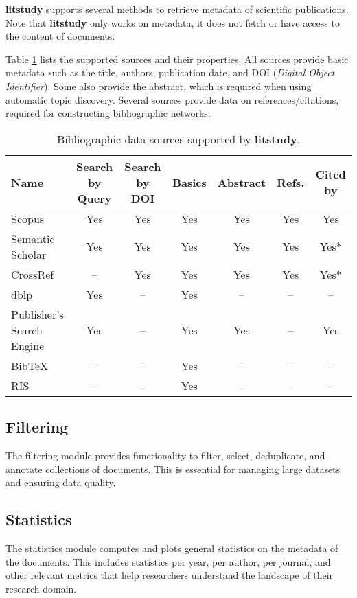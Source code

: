 \documentclass{article}
\begin{document}
\textbf{litstudy} supports several methods to retrieve metadata of scientific publications. Note that \textbf{litstudy} only works on metadata, it does not fetch or have access to the content of documents.

Table \ref{tab:sources} lists the supported sources and their properties. All sources provide basic metadata such as the title, authors, publication date, and DOI (\textit{Digital Object Identifier}). Some also provide the abstract, which is required when using automatic topic discovery. Several sources provide data on references/citations, required for constructing bibliographic networks.

\begin{table}[h]
\centering
\caption{Bibliographic data sources supported by \textbf{litstudy}.}
\label{tab:sources}
\begin{tabular}{@{}lcccccc@{}}
\toprule
Name & Search by Query & Search by DOI & Basics & Abstract & Refs. & Cited by \\
\midrule
Scopus & Yes & Yes & Yes & Yes & Yes & Yes \\
Semantic Scholar & Yes & Yes & Yes & Yes & Yes & Yes* \\
CrossRef & -- & Yes & Yes & Yes & Yes & Yes* \\
dblp & Yes & -- & Yes & -- & -- & -- \\
Publisher's Search Engine & Yes & -- & Yes & Yes & -- & Yes \\
BibTeX & -- & -- & Yes & -- & -- & -- \\
RIS & -- & -- & Yes & -- & -- & -- \\
\bottomrule
\end{tabular}
\end{table}

\subsection{Filtering}

The filtering module provides functionality to filter, select, deduplicate, and annotate collections of documents. This is essential for managing large datasets and ensuring data quality.

\subsection{Statistics}

The statistics module computes and plots general statistics on the metadata of the documents. This includes statistics per year, per author, per journal, and other relevant metrics that help researchers understand the landscape of their research domain.
\end{document}
